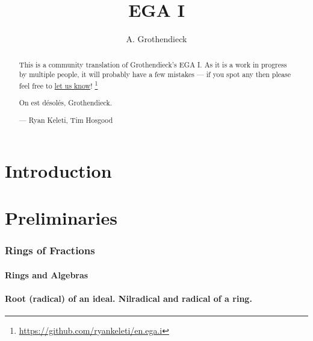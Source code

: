 \documentclass[10pt,oneside]{amsart}
\title{EGA I}
\author{A. Grothendieck}
\begin{document}
\renewcommand{\abstractname}{What this is}
\begin{abstract}
    This is a community translation of Grothendieck's EGA I.
    As it is a work in progress by multiple people, it will probably have a few mistakes --- if you spot any then please feel free to \href{https://github.com/ryankeleti/en.ega.i/issues}{let us know}!
    \thanks{\url{https://github.com/ryankeleti/en.ega.i}}
    
    On est désolés, Grothendieck.

    --- Ryan Keleti, Tim Hosgood
\end{abstract}

\maketitle

\noindent\hspace{0.15\linewidth}
\begin{minipage}{0.7\linewidth}
    \tableofcontents{}
\end{minipage}


\clearpage


\part*{Introduction}



\clearpage


\setcounter{part}{-1}

\part{Preliminaries}

    \section{Rings of Fractions}

        \subsection{Rings and Algebras}
        

        \subsection{Root (radical) of an ideal. Nilradical and radical of a ring.}
        
\end{document}
